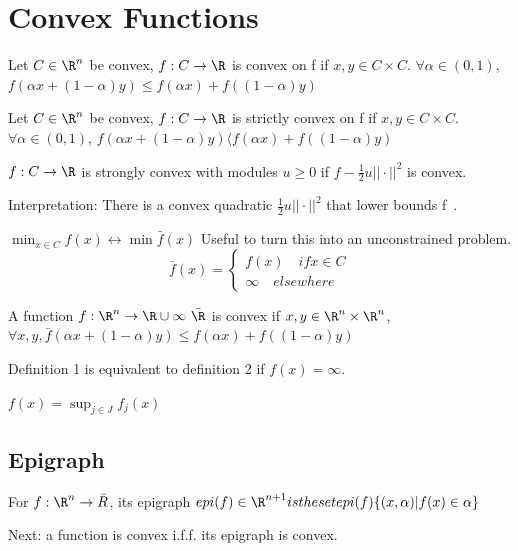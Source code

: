 \section{Convex Functions}
\begin{definition}
Let $C \in \R^n$ be convex, $f:C \to \R$ is convex on f if $x,y \in C \times C$. $\forall \alpha \in (0,1)$, $f(\alpha x + (1-\alpha) y) \le f(\alpha x) + f((1-\alpha) y)$
\end{definition}

\begin{definition}
Let $C \in \R^n$ be convex, $f:C \to \R$ is strictly convex on f if $x,y \in C \times C$. $\forall \alpha \in (0,1)$, $f(\alpha x + (1-\alpha) y) \langle f(\alpha x) + f((1-\alpha) y)$
\end{definition}

\begin{definition}
$f:C \to \R$ is strongly convex with modules $u \ge 0$ if $f - \frac{1}{2}u || \cdot ||^2$ is convex.
\end{definition}
Interpretation: There is a convex quadratic $\frac{1}{2}u || \cdot ||^2$ that lower bounds f~\cite{aminiMLCPMProcessMonitoring2018}.
\begin{example}
$\min_{x \in C} f(x) \leftrightarrow \min \bar{f}(x)$
Useful to turn this into an unconstrained problem. \\
$$\bar{f}(x) = \begin{cases}
f(x) \quad if x \in C \\
\infty \quad  elsewhere
\end{cases}$$
\end{example}
\begin{definition}
A function $f : \R^n \to \R \cup \infty \ \bar{\R}$ is convex if $x,y \in \R^n \times \R^n$, $\forall x,y , \bar{f}(\alpha x + (1-\alpha) y) \le f(\alpha x) + f((1-\alpha) y)$
\end{definition}
Definition 1 is equivalent to definition 2 if $f(x) = \infty$.
\begin{example}
$f(x) = \sup_{j \in J} f_j(x)$
\end{example}

\subsection{Epigraph} 
\begin{definition}[Epigraph]
For $f: \R^n \rightarrow \bar{R}$, its epigraph $epi(f) \in \R^{n+1} is the set epi(f) \{ (x,\alpha) | f(x) \in \alpha \}$
\end{definition}
Next: a function is convex i.f.f. its epigraph is convex.

